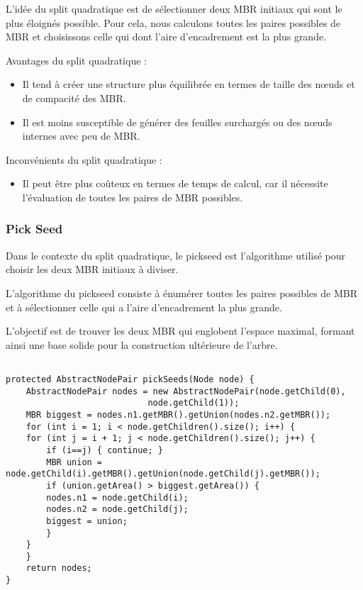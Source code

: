 \documentclass {article}
\begin{document}
L'idée du split quadratique est de sélectionner deux MBR initiaux qui sont le plus éloignés possible.
Pour cela, nous calculons toutes les paires possibles de MBR et choisissons celle qui dont 
l'aire d'encadrement est la plus grande.

Avantages du split quadratique :

\begin{itemize}
    \item Il tend à créer une structure plus équilibrée en termes de taille des nœuds et de 
	compacité des MBR.
    \item Il est moins susceptible de générer des feuilles surchargés ou des nœuds internes 
	avec peu de MBR.

\end{itemize}
Inconvénients du split quadratique :

\begin{itemize}
    \item Il peut être plus coûteux en termes de temps de calcul, car il nécessite l'évaluation 
	de toutes les paires de MBR possibles.
\end{itemize}

\subsubsection {Pick Seed}


Dans le contexte du split quadratique, le pickseed est l'algorithme utilisé pour choisir les 
deux MBR initiaux à diviser.

L'algorithme du pickseed consiste à énumérer toutes les paires possibles de MBR et à sélectionner 
celle qui a l'aire d'encadrement la plus grande.

L'objectif est de trouver les deux MBR qui englobent l'espace maximal, formant ainsi une base solide 
pour la construction ultérieure de l'arbre.

\begin{verbatim}

protected AbstractNodePair pickSeeds(Node node) {
    AbstractNodePair nodes = new AbstractNodePair(node.getChild(0), 
						    node.getChild(1));
    MBR biggest = nodes.n1.getMBR().getUnion(nodes.n2.getMBR());
    for (int i = 1; i < node.getChildren().size(); i++) {
	for (int j = i + 1; j < node.getChildren().size(); j++) {
	    if (i==j) { continue; }
	    MBR union = node.getChild(i).getMBR().getUnion(node.getChild(j).getMBR());
	    if (union.getArea() > biggest.getArea()) {
		nodes.n1 = node.getChild(i);
		nodes.n2 = node.getChild(j);
		biggest = union;
	    }
	}
    }
    return nodes;
}
\end{verbatim}
\end{document}
